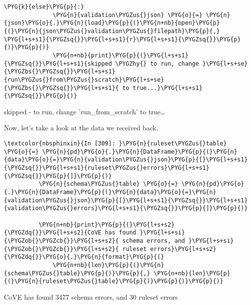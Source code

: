 \documentclass[letterpaper,10pt,english]{sphinxmanual}
\begin{document}
\begin{Verbatim}[commandchars=\\\{\}]
          \PYG{k}{else}\PYG{p}{:}
              \PYG{n}{validation\PYGZus{}json} \PYG{o}{=} \PYG{n}{json}\PYG{o}{.}\PYG{n}{load}\PYG{p}{(}\PYG{n+nb}{open}\PYG{p}{(}\PYG{n}{json\PYGZus{}validation\PYGZus{}filepath}\PYG{p}{,} \PYG{l+s+s1}{\PYGZsq{}}\PYG{l+s+s1}{r}\PYG{l+s+s1}{\PYGZsq{}}\PYG{p}{)}\PYG{p}{)}
              \PYG{n+nb}{print}\PYG{p}{(}\PYG{l+s+s1}{\PYGZsq{}}\PYG{l+s+s1}{skipped \PYGZhy{} to run, change }\PYG{l+s+se}{\PYGZbs{}\PYGZsq{}}\PYG{l+s+s1}{run\PYGZus{}from\PYGZus{}scratch}\PYG{l+s+se}{\PYGZbs{}\PYGZsq{}}\PYG{l+s+s1}{ to true...}\PYG{l+s+s1}{\PYGZsq{}}\PYG{p}{)}
\end{Verbatim}
%
\begin{OriginalVerbatim}[commandchars=\\\{\}]
skipped - to run, change 'run\_from\_scratch' to true{\ldots}
\end{OriginalVerbatim}
\relax
Now, let's take a look at the data we received back.

\begin{Verbatim}[commandchars=\\\{\}]
\textcolor{nbsphinxin}{In [309]: }\PYG{n}{ruleset\PYGZus{}table} \PYG{o}{=} \PYG{n}{pd}\PYG{o}{.}\PYG{n}{DataFrame}\PYG{p}{(}\PYG{n}{data}\PYG{o}{=}\PYG{n}{validation\PYGZus{}json}\PYG{p}{[}\PYG{l+s+s1}{\PYGZsq{}}\PYG{l+s+s1}{ruleset\PYGZus{}errors}\PYG{l+s+s1}{\PYGZsq{}}\PYG{p}{]}\PYG{p}{)}
          \PYG{n}{schema\PYGZus{}table} \PYG{o}{=} \PYG{n}{pd}\PYG{o}{.}\PYG{n}{DataFrame}\PYG{p}{(}\PYG{n}{data}\PYG{o}{=}\PYG{n}{validation\PYGZus{}json}\PYG{p}{[}\PYG{l+s+s1}{\PYGZsq{}}\PYG{l+s+s1}{validation\PYGZus{}errors}\PYG{l+s+s1}{\PYGZsq{}}\PYG{p}{]}\PYG{p}{)}
          
          \PYG{n+nb}{print}\PYG{p}{(}\PYG{l+s+s2}{\PYGZdq{}}\PYG{l+s+s2}{CoVE has found }\PYG{l+s+si}{\PYGZob{}\PYGZcb{}}\PYG{l+s+s2}{ schema errors, and }\PYG{l+s+si}{\PYGZob{}\PYGZcb{}}\PYG{l+s+s2}{ ruleset errors}\PYG{l+s+s2}{\PYGZdq{}}\PYG{o}{.}\PYG{n}{format}\PYG{p}{(}
              \PYG{n+nb}{len}\PYG{p}{(}\PYG{n}{schema\PYGZus{}table}\PYG{p}{)}\PYG{p}{,} \PYG{n+nb}{len}\PYG{p}{(}\PYG{n}{ruleset\PYGZus{}table}\PYG{p}{)}\PYG{p}{)}\PYG{p}{)}
\end{Verbatim}
%
\begin{OriginalVerbatim}[commandchars=\\\{\}]
CoVE has found 3477 schema errors, and 30 ruleset errors
\end{OriginalVerbatim}
\relax
\end{document}
